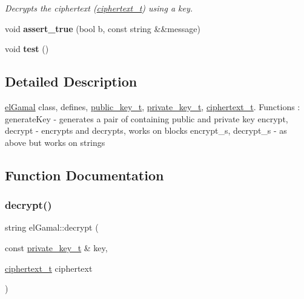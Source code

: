 \begin{DoxyCompactItemize}
\begin{DoxyCompactList}\small\item\em Decrypts the ciphertext (\mbox{\hyperlink{structelGamal_1_1ciphertext__t}{ciphertext\+\_\+t}}) using a key. \end{DoxyCompactList}\item 
\mbox{\label{namespaceelGamal_a1be22a37709d73fbc4580b00a396c0b9}} 
void {\bfseries assert\+\_\+true} (bool b, const string \&\&message)
\item 
\mbox{\label{namespaceelGamal_a2c9abe3957874b9c4bb9924daafc3ba2}} 
void {\bfseries test} ()
\end{DoxyCompactItemize}


\subsection{Detailed Description}
\mbox{\hyperlink{namespaceelGamal}{el\+Gamal}} class, defines, \mbox{\hyperlink{structelGamal_1_1public__key__t}{public\+\_\+key\+\_\+t}}, \mbox{\hyperlink{structelGamal_1_1private__key__t}{private\+\_\+key\+\_\+t}}, \mbox{\hyperlink{structelGamal_1_1ciphertext__t}{ciphertext\+\_\+t}}. Functions \+: generate\+Key -\/ generates a pair of containing public and private key encrypt, decrypt -\/ encrypts and decrypts, works on blocks encrypt\+\_\+s, decrypt\+\_\+s -\/ as above but works on strings 

\subsection{Function Documentation}
\mbox{\label{namespaceelGamal_a7d43bd19f4fbfe6cca1232a7b2f23af6}} 
\subsubsection{\texorpdfstring{decrypt()}{decrypt()}}
{\footnotesize\ttfamily string el\+Gamal\+::decrypt (\begin{DoxyParamCaption}\item[{const \mbox{\hyperlink{structelGamal_1_1private__key__t}{private\+\_\+key\+\_\+t}} \&}]{key,  }\item[{\mbox{\hyperlink{structelGamal_1_1ciphertext__t}{ciphertext\+\_\+t}}}]{ciphertext }\end{DoxyParamCaption})}



